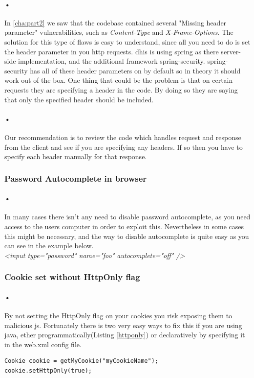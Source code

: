 \documentclass[11pt,english,a4paper]{report}
\begin{document}
\paragraph{•}

In \ref{cha:part2} we saw that the codebase contained several "Missing header parameter" vulnerabilities, such as \textit{Content-Type} and 
\textit{X-Frame-Options}.
The solution for this type of flaws is easy to understand, since all you need to do is set the header parameter in you \gls{http} requests.
\gls{dhis} is using \gls{spring} as there server-side implementation, and the additional framework \gls{spring}-security.
\gls{spring}-security has all of these header parameters on by default so in theory it should work out of the box.
One thing that could be the problem is that on certain requests they are specifying a header in the code.
By doing so they are saying that only the specified header should be included.
\paragraph{•}
Our recommendation is to review the code which handles request and response from the client and see if you are specifying any headers.
If so then you have to specify each header manually for that response.\cite{spring-security}

\subsubsection{Password Autocomplete in browser}
\paragraph{•}
In many cases there isn't any need to disable password autocomplete, as you need access to the users computer in order to exploit this.
Nevertheless in some cases this might be necessary, and the way to disable autocomplete is quite easy as you can see in the example below.
\\
\textit{ \textless input type="password" name="foo" autocomplete="off" /\textgreater}

\subsubsection{Cookie set without HttpOnly flag}
\paragraph{•}
By not setting the HttpOnly flag on your cookies you risk exposing them to malicious \gls{js}.
Fortunately there is two very easy ways to fix this if you are using \gls{java}, ether programmatically(Listing \ref{httponly}) or declaratively by specifying it in the web.xml config file.\cite{httponly}
\\
\begin{lstlisting}[caption=Setting the HttpOnly Flag in Java,label=httponly]
Cookie cookie = getMyCookie("myCookieName");
cookie.setHttpOnly(true);
\end{lstlisting}
\end{document}
